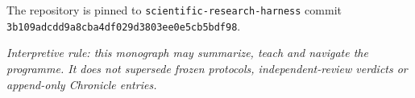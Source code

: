 \documentclass[10pt,a4paper]{article}
\newcommand{\code}[1]{\texttt{#1}}
\begin{document}
The repository is pinned to \code{scientific-research-harness} commit
\code{3b109adcdd9a8cba4df029d3803ee0e5cb5bdf98}.

\vfill
\begin{center}
\small
\textit{Interpretive rule: this monograph may summarize, teach and navigate the programme. It does not supersede
frozen protocols, independent-review verdicts or append-only Chronicle entries.}
\end{center}
\end{document}
